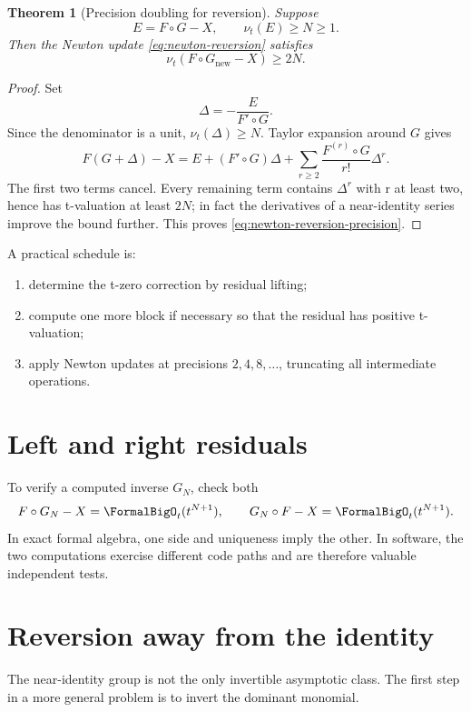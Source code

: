 \documentclass[11pt,openany]{book}
\theoremstyle{definition}
\theoremstyle{plain}
\newtheorem{theorem}{Theorem}[chapter]
\theoremstyle{remark}
\newcommand{\val}{\nu}
\newcommand{\compose}{\mathbin{\circ}}
\begin{document}
\begin{theorem}[Precision doubling for reversion]\label{thm:newton-reversion}
Suppose
\[
 E=F\compose G-X,
 \qquad \val_t(E)\ge N\ge1.
\]
Then the Newton update \cref{eq:newton-reversion} satisfies
\begin{equation}\label{eq:newton-reversion-precision}
 \val_t(F\compose G_{\mathrm{new}}-X)\ge2N.
\end{equation}
\end{theorem}
\begin{proof}
Set
\[
 \Delta=-\frac{E}{F'\compose G}.
\]
Since the denominator is a unit, \(\val_t(\Delta)\ge N\).  Taylor expansion
around \(G\) gives
\[
 F(G+\Delta)-X
 =E+(F'\compose G)\Delta
 +\sum_{r\ge2}\frac{F^{(r)}\compose G}{r!}\Delta^r.
\]
The first two terms cancel.  Every remaining term contains \(\Delta^r\) with
r at least two, hence has t-valuation at least \(2N\); in fact the derivatives
of a near-identity series improve the bound further.  This proves
\cref{eq:newton-reversion-precision}.
\end{proof}

A practical schedule is:
\begin{enumerate}
\item determine the t-zero correction by residual lifting;
\item compute one more block if necessary so that the residual has positive
      t-valuation;
\item apply Newton updates at precisions \(2,4,8,\ldots\), truncating all
      intermediate operations.
\end{enumerate}

\section{Left and right residuals}
To verify a computed inverse \(G_N\), check both
\begin{equation}\label{eq:two-residuals}
 F\compose G_N-X=\FormalBigO_t(t^{N+1}),
 \qquad
 G_N\compose F-X=\FormalBigO_t(t^{N+1}).
\end{equation}
In exact formal algebra, one side and uniqueness imply the other.  In software,
the two computations exercise different code paths and are therefore valuable
independent tests.

\section{Reversion away from the identity}
The near-identity group is not the only invertible asymptotic class.  The first
step in a more general problem is to invert the dominant monomial.
\end{document}
